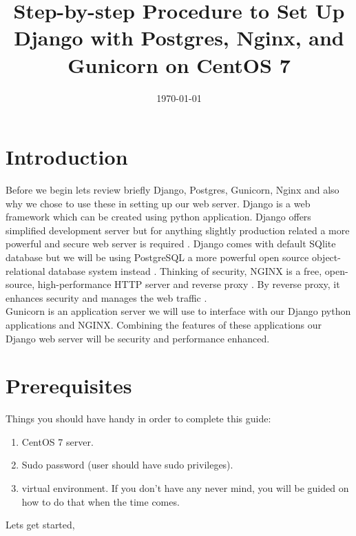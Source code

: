 \documentclass[a4paper]{article}
\title{Step-by-step Procedure to Set Up Django with Postgres, Nginx, and Gunicorn on CentOS 7}
\date{\today}
\begin{document}
\maketitle

\section*{Introduction}
 \label{introduction}
Before we begin lets review briefly Django, Postgres, Gunicorn, Nginx and also why we chose to use these in
setting up our web server.  Django is a web framework which can be created using python application. Django
offers simplified development server but for anything slightly production related a more powerful and
secure web server is required  . 
Django comes with default SQlite database but we will be using PostgreSQL a more powerful open source
object-relational database system instead . Thinking of security, NGINX is a free, open-source, high-performance HTTP server and reverse proxy . By reverse proxy, it enhances security and manages the web
traffic .\\ 
Gunicorn is an application server we will use to interface with our Django python applications and NGINX. Combining the features of these applications our Django web server will be security and performance enhanced. \par

\section* {Prerequisites}
\label{prerequisite}
Things you should have handy in order to complete this guide:

\begin{enumerate}
	\item CentOS 7 server.
	\item Sudo password (user should have sudo privileges).
	\item virtual environment. If you don't have any never mind, you will be guided on how to do that when the time comes.\\
\end{enumerate}

Lets get started,\\
\end{document}
